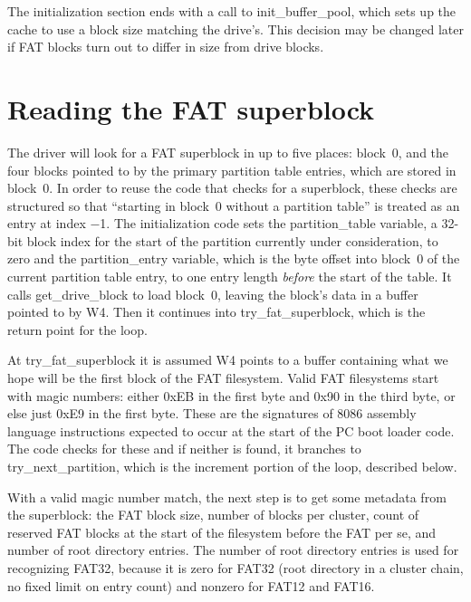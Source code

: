 The initialization section ends with a call to init\_buffer\_pool, which
sets up the cache to use a block size matching the drive's.  This decision
may be changed later if FAT blocks turn out to differ in size from drive
blocks.

\section{Reading the FAT superblock}

The driver will look for a FAT superblock in up to five places:  block~0,
and the four blocks pointed to by the primary partition table entries, which
are stored in block~0.  In order to reuse the code that checks for a
superblock, these checks are structured so that ``starting in block~0
without a partition table'' is treated as an entry at index $-$1.  The
initialization code sets the partition\_table variable, a 32-bit block index
for the start of the partition currently under consideration, to zero and
the partition\_entry variable, which is the byte offset into block~0 of the
current partition table entry, to one entry length \emph{before} the start
of the table.  It calls get\_drive\_block to load block~0, leaving the
block's data in a buffer pointed to by W4.  Then it continues into
try\_fat\_superblock, which is the return point for the loop.

At try\_fat\_superblock it is assumed W4 points to a buffer containing what
we hope will be the first block of the FAT filesystem.  Valid FAT
filesystems start with magic numbers: either 0xEB in the first byte and 0x90
in the third byte, or else just 0xE9 in the first byte.  These are the
signatures of 8086 assembly language instructions expected to occur at the
start of the PC boot loader code.  The code checks for these and if neither
is found, it branches to try\_next\_partition, which is the increment
portion of the loop, described below.

With a valid magic number match, the next step is to get some metadata from
the superblock: the FAT block size, number of blocks per cluster, count of
reserved FAT blocks at the start of the filesystem before the FAT per se,
and number of root directory entries.  The number of root directory entries
is used for recognizing FAT32, because it is zero for FAT32 (root directory
in a cluster chain, no fixed limit on entry count) and nonzero for FAT12 and
FAT16.

